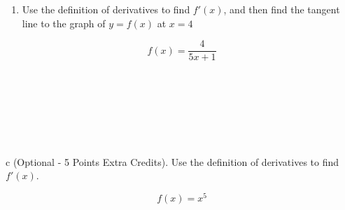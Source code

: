 \documentclass[
  letterpaper,
  DIV=11,
  numbers=noendperiod]{scrartcl}
\providecommand{\tightlist}{%
  \setlength{\itemsep}{0pt}\setlength{\parskip}{0pt}}\usepackage{longtable,booktabs,array}
\begin{document}
\hfill\break
\hfill\break
\hfill\break
\hfill\break

\hfill\break
\hfill\break
\hfill\break
\hfill\break

\hfill\break
\hfill\break
\hfill\break
\hfill\break

\thispagestyle{empty}

\begin{enumerate}
\def\labelenumi{\alph{enumi}.}
\setcounter{enumi}{1}
\tightlist
\item
  Use the definition of derivatives to find \(f'(x)\), and then find the
  tangent line to the graph of \(y = f(x)\) at \(x = 4\)
\end{enumerate}

\[
f(x) = \frac{4}{5x+1}
\]\\
\strut \\
\strut \\
\strut \\

\hfill\break
\hfill\break
\hfill\break
\hfill\break

\hfill\break
\hfill\break
\hfill\break
\hfill\break

\hfill\break
\hfill\break
\hfill\break
\hfill\break

\hfill\break
\hfill\break
\hfill\break
\hfill\break

\hfill\break
\hfill\break
\hfill\break
\hfill\break

\thispagestyle{empty}

c (Optional - 5 Points Extra Credits). Use the definition of derivatives
to find \(f'(x)\).

\[
f(x) = x^5
\]
\end{document}
